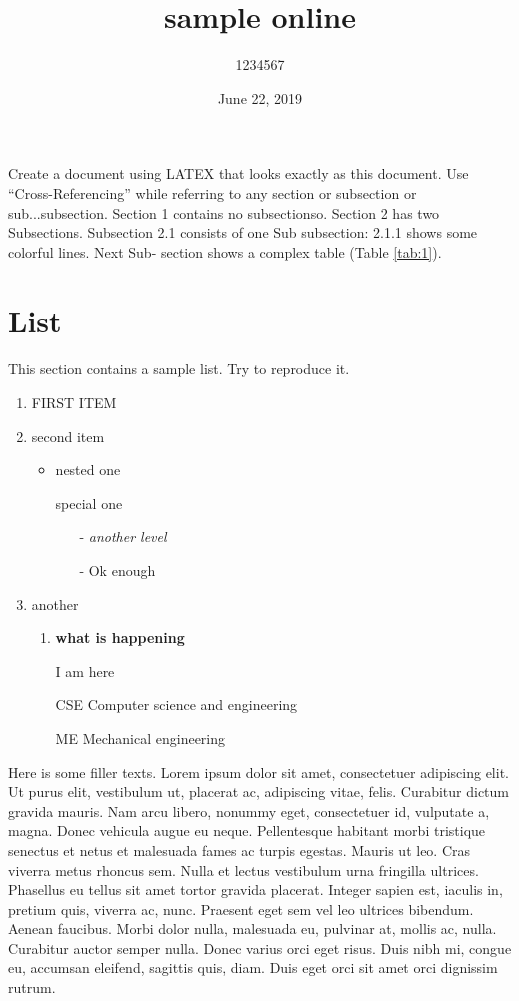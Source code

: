 \documentclass{article}
\title{
sample online\\
}
\author{1234567}
\date{June 22, 2019 }
\begin{document}
\maketitle

Create a document using LATEX that looks exactly as this document. Use “Cross-Referencing” while referring to any section or subsection or sub...subsection. Section 1 contains no subsectionso. Section 2 has two Subsections. Subsection 2.1 consists of one Sub subsection: 2.1.1 shows some colorful lines. Next Sub-
section shows a complex table (Table \ref{tab:1}).

\section{List}
This section contains a sample list. Try to reproduce it.
\begin{enumerate}
    \item FIRST ITEM
    \item second item
        \begin{itemize}
            \item nested one
            \item [] special one
            \begin{itemize}
                \item [-] \textit{another level}
                \item [-] Ok enough
            \end{itemize}
        \end{itemize}
    \item another
        \begin{enumerate}
            \item \textbf{what is happening}
            \item[] I am here 
            \item[CSE] Computer science and engineering 
            \item[ME] Mechanical engineering 
        \end{enumerate}
\end{enumerate}
\vspace{3mm}
Here is some filler texts. Lorem ipsum dolor sit amet, consectetuer adipiscing elit. Ut purus elit, vestibulum ut, placerat ac, adipiscing vitae, felis. Curabitur dictum gravida mauris. Nam arcu libero, nonummy eget, consectetuer id, vulputate a, magna. Donec vehicula augue eu neque. Pellentesque habitant morbi tristique senectus et netus et malesuada fames ac turpis egestas. Mauris ut leo. Cras viverra metus rhoncus sem. Nulla et lectus vestibulum urna fringilla ultrices. Phasellus eu tellus sit amet tortor gravida placerat. Integer sapien
est, iaculis in, pretium quis, viverra ac, nunc. Praesent eget sem vel leo ultrices 
bibendum. Aenean faucibus. Morbi dolor nulla, malesuada eu, pulvinar at, mollis ac, nulla. Curabitur auctor semper nulla. Donec varius orci eget risus. Duis nibh mi, congue eu, accumsan eleifend, sagittis quis, diam. Duis eget orci
sit amet orci dignissim rutrum.
\end{document}
